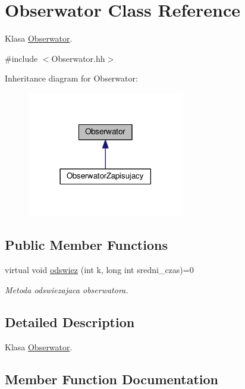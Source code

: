 \hypertarget{a00015}{}\section{Obserwator Class Reference}
\label{a00015}


Klasa \hyperlink{a00015}{Obserwator}.  




{\ttfamily \#include $<$Obserwator.\+hh$>$}



Inheritance diagram for Obserwator\+:
\nopagebreak
\begin{figure}[H]
\begin{center}
\leavevmode
\includegraphics[width=194pt]{a00157}
\end{center}
\end{figure}
\subsection*{Public Member Functions}
\begin{DoxyCompactItemize}
\item 
virtual void \hyperlink{a00015_a35f475b38bb63eac2a4d08a8d27aff7a}{odswiez} (int k, long int sredni\+\_\+czas)=0
\begin{DoxyCompactList}\small\item\em Metoda odswiezajaca obserwatora. \end{DoxyCompactList}\end{DoxyCompactItemize}


\subsection{Detailed Description}
Klasa \hyperlink{a00015}{Obserwator}. 

\subsection{Member Function Documentation}
\hypertarget{a00015_a35f475b38bb63eac2a4d08a8d27aff7a}{}
